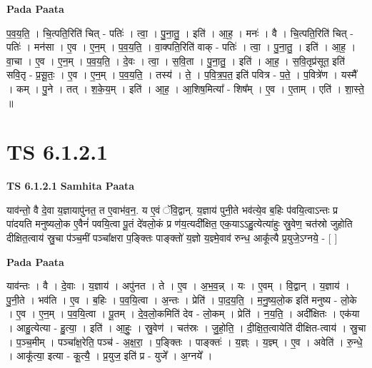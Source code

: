 \documentclass[17pt]{extarticle}
\begin{document}
\textbf{Pada Paata} \newline

प॒व॒य॒ति॒ । चि॒त्पति॒रिति॑ चित् - पतिः॑ । त्वा॒ । पु॒ना॒तु॒ । इति॑ । आ॒ह॒ । मनः॑ । वै । चि॒त्पति॒रिति॑ चित् - पतिः॑ । मन॑सा । ए॒व । ए॒न॒म् । प॒व॒य॒ति॒ । वा॒क्पति॒रिति॑ वाक् - पतिः॑ । त्वा॒ । पु॒ना॒तु॒ । इति॑ । आ॒ह॒ । वा॒चा । ए॒व । ए॒न॒म् । प॒व॒य॒ति॒ । दे॒वः । त्वा॒ । स॒वि॒ता । पु॒ना॒तु॒ । इति॑ । आ॒ह॒ । स॒वि॒तृप्र॑सूत॒ इति॑ सवि॒तृ - प्र॒सू॒तः॒ । ए॒व । ए॒न॒म् । प॒व॒य॒ति॒ । तस्य॑ । ते॒ । प॒वि॒त्र॒प॒त॒ इति॑ पवित्र - प॒ते॒ । प॒वित्रे॑ण । यस्मै᳚ । कम् । पु॒ने । तत् । श॒के॒य॒म् । इति॑ । आ॒ह॒ । आ॒शिष॒मित्या᳚ - शिष᳚म् । ए॒व । ए॒ताम् । एति॑ । शा॒स्ते॒ ॥  \newline





\section{ TS 6.1.2.1 }

\textbf{TS 6.1.2.1 } \newline
\textbf{Samhita Paata} \newline

याव॑न्तो॒ वै दे॒वा य॒ज्ञायापु॑नत॒ त ए॒वाभ॑व॒न॒. य ए॒वं ॅवि॒द्वान्. य॒ज्ञाय॑ पुनी॒ते भव॑त्ये॒व ब॒हिः प॑वयि॒त्वाऽन्तः प्र पा॑दयति मनुष्यलो॒क ए॒वैनं॑ पवयि॒त्वा पू॒तं दे॑वलो॒कं प्र ण॑य॒त्यदी᳚क्षित॒ एक॒याऽऽहु॒त्येत्या॑हुः स्रु॒वेण॒ चत॑स्रो जुहोति दीक्षित॒त्वाय॑ स्रु॒चा प॑ञ्च॒मीं पञ्चा᳚क्षरा प॒ङ्क्तिः पाङ्क्तो॑ य॒ज्ञो य॒ज्ञ्मे॒वाव॑ रुन्ध॒ आकू᳚त्यै प्र॒युजे॒ऽग्नये॒ - [  ] \newline

\textbf{Pada Paata} \newline

याव॑न्तः । वै । दे॒वाः । य॒ज्ञाय॑ । अपु॑नत । ते । ए॒व । अ॒भ॒व॒न्न् । यः । ए॒वम् । वि॒द्वान् । य॒ज्ञाय॑ । पु॒नी॒ते । भव॑ति । ए॒व । ब॒हिः । प॒व॒यि॒त्वा । अ॒न्तः । प्रेति॑ । पा॒द॒य॒ति॒ । म॒नु॒ष्य॒लो॒क इति॑ मनुष्य - लो॒के । ए॒व । ए॒न॒म् । प॒व॒यि॒त्वा । पू॒तम् । दे॒व॒लो॒कमिति॑ देव - लो॒कम् । प्रेति॑ । न॒य॒ति॒ । अदी᳚क्षितः । एक॑या । आहु॒त्येत्या - हु॒त्या॒ । इति॑ । आ॒हुः॒ । स्रु॒वेण॑ । चत॑स्रः । जु॒हो॒ति॒ । दी॒क्षि॒त॒त्वायेति॑ दीक्षित-त्वाय॑ । स्रु॒चा । प॒ञ्च॒मीम् । पञ्चा᳚क्ष॒रेति॒ पञ्च॑ - अ॒क्ष॒रा॒ । प॒ङ्क्तिः । पाङ्क्तः॑ । य॒ज्ञ्ः । य॒ज्ञ्म् । ए॒व । अवेति॑ । रु॒न्धे॒ । आकू᳚त्या॒ इत्या - कू॒त्यै॒ । प्र॒युज॒ इति॑ प्र - युजे᳚ । अ॒ग्नये᳚ ।  \newline
\end{document}
